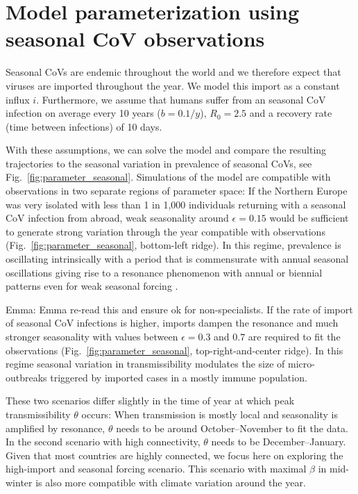 \documentclass[rmp, reprint, superscriptaddress, floatfix,amsmath]{revtex4-1}
\newcommand{\Richard}[1]{{\color{drab}Richard: #1}}
\newcommand{\Robert}[1]{{\color{celestialblue}Robert: #1}}
\newcommand{\Jan}[1]{{\color{deepsaffron}Jan: #1}}
\newcommand{\Emma}[1]{{\color{purple}Emma: #1}}
\begin{document}
\section{Model parameterization using seasonal CoV observations}
Seasonal CoVs are endemic throughout the world and we therefore expect that viruses are imported throughout the year. 
We model this import as a constant influx $i$. 
Furthermore, we assume that humans suffer from an seasonal CoV infection on average every 10 years ($b=0.1/y$), $R_0=2.5$ and a recovery rate (time between infections) of 10 days.

With these assumptions, we can solve the model and compare the resulting trajectories to the seasonal variation in prevalence of seasonal CoVs, see Fig.~\ref{fig:parameter_seasonal}.
Simulations of the model are compatible with observations in two separate regions of parameter space: If the Northern Europe was very isolated with less than 1 in 1,000 individuals returning with a seasonal CoV infection from abroad, weak seasonality around $\epsilon=0.15$ would be sufficient to generate strong variation through the year compatible with observations (Fig.~\ref{fig:parameter_seasonal}, bottom-left ridge).
In this regime, prevalence is oscillating intrinsically with a period that is commensurate with annual seasonal oscillations giving rise to a resonance phenomenon with annual or biennial patterns even for weak seasonal forcing \citep{dushoff_dynamical_2004,chen_regular_2017}.

\Emma{Emma re-read this and ensure ok for non-specialists.}
If the rate of import of seasonal CoV infections is higher, imports dampen the resonance and much stronger seasonality with values between $\epsilon=0.3$ and $0.7$ are required to fit the observations (Fig.~\ref{fig:parameter_seasonal}, top-right-and-center ridge).
In this regime seasonal variation in transmissibility modulates the size of micro-outbreaks triggered by imported cases in a mostly immune population. 

These two scenarios differ slightly in the time of year at which peak transmissibility $\theta$ occurs: 
When transmission is mostly local and seasonality is amplified by resonance, $\theta$ needs to be around October--November to fit the data. 
In the second scenario with high connectivity, $\theta$ needs to be December--January. 
Given that most countries are highly connected, we focus here on exploring the high-import and seasonal forcing scenario.
This scenario with maximal $\beta$ in mid-winter is also more compatible with climate variation around the year.
\end{document}
